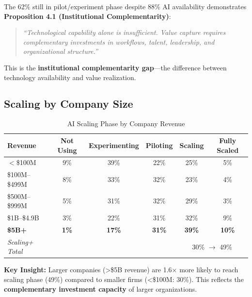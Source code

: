 \begin{tcolorbox}[colback=yellow!5!white, colframe=yellow!75!black,
    title=EBF Framework Implication: Institutional Complementarity Gap]

The 62\% still in pilot/experiment phase despite 88\% AI availability demonstrates \textbf{Proposition 4.1 (Institutional Complementarity)}:

\begin{quote}
\textit{``Technological capability alone is insufficient. Value capture requires complementary investments in workflows, talent, leadership, and organizational structure.''}
\end{quote}

This is the \textbf{institutional complementarity gap}---the difference between technology availability and value realization.

\end{tcolorbox}


\subsection{Scaling by Company Size}

\begin{table}[htbp]
\centering
\caption{AI Scaling Phase by Company Revenue}
\label{tab:vvv1-size}
\renewcommand{\arraystretch}{1.3}
\begin{tabular}{@{}lccccc@{}}
\toprule
\textbf{Revenue} & \textbf{Not Using} & \textbf{Experimenting} & \textbf{Piloting} & \textbf{Scaling} & \textbf{Fully Scaled} \\
\midrule
$<$\$100M & 9\% & 39\% & 22\% & 25\% & 5\% \\
\$100M--\$499M & 8\% & 33\% & 32\% & 23\% & 4\% \\
\$500M--\$999M & 5\% & 31\% & 32\% & 29\% & 3\% \\
\$1B--\$4.9B & 3\% & 22\% & 31\% & 32\% & 9\% \\
\textbf{\$5B+} & \textbf{1\%} & \textbf{17\%} & \textbf{31\%} & \textbf{39\%} & \textbf{10\%} \\
\midrule
\textit{Scaling+ Total} & & & & \multicolumn{2}{c}{30\% $\to$ 49\%} \\
\bottomrule
\end{tabular}
\end{table}

\textbf{Key Insight:} Larger companies (>\$5B revenue) are 1.6× more likely to reach scaling phase (49\%) compared to smaller firms (<\$100M: 30\%). This reflects the \textbf{complementary investment capacity} of larger organizations.


